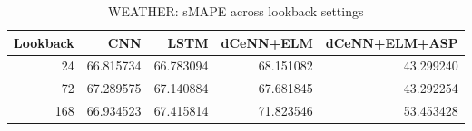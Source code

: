 \begin{table}
\caption{WEATHER: sMAPE across lookback settings}
\begin{tabular}{rrrrr}
\toprule
Lookback & CNN & LSTM & dCeNN+ELM & dCeNN+ELM+ASP \\
\midrule
24 & 66.815734 & 66.783094 & 68.151082 & 43.299240 \\
72 & 67.289575 & 67.140884 & 67.681845 & 43.292254 \\
168 & 66.934523 & 67.415814 & 71.823546 & 53.453428 \\
\bottomrule
\end{tabular}
\end{table}
